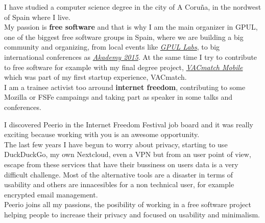 \documentclass[11pt, a4paper]{awesome-cv} %
\begin{document}
\makecvheader %

\makelettertitle %


\begin{cvletter}



I have studied a computer science degree in the city of A Coruña, in the nordwest of Spain where I live. \\
My passion is \textbf{free software} and that is why I am the main organizer in GPUL, one of the biggest free software groups in Spain, where we are building a big community and organizing, from local events like \emph{\href{http://labs.gpul.org/}{GPUL Labs}}, to big international conferences as \emph{\href{https://akademy.kde.org/2015}{Akademy 2015}}.
At the same time I try to contribute to free software for example with my final degree project, \emph{\href{https://github.com/vacmatch/vacmatch-mobile}{VACmatch Mobile}} which was part of my first startup experience, VACmatch.\\
I am a trainee activist too arround \textbf{internet freedom}, contributing to some Mozilla or FSFe campaings and taking part as speaker in some talks and conferences.



I discovered Peerio in the Internet Freedom Festival job board and it was really exciting because working with you is an awesome opportunity.\\
The last few years I have begun to worry about privacy, starting to use DuckDuckGo, my own Nextcloud, even a VPN but from an user point of view, escape from these services that have their bussiness on users data is a very difficult challenge. Most of the alternative tools are a disaster in terms of usability and others are innacesibles for a non technical user, for example encrypted email management. \\
Peerio joins all my passions, the posibility of working in a free software project helping people to increase their privacy and focused on usability and minimalism.



\end{cvletter}
\end{document}
